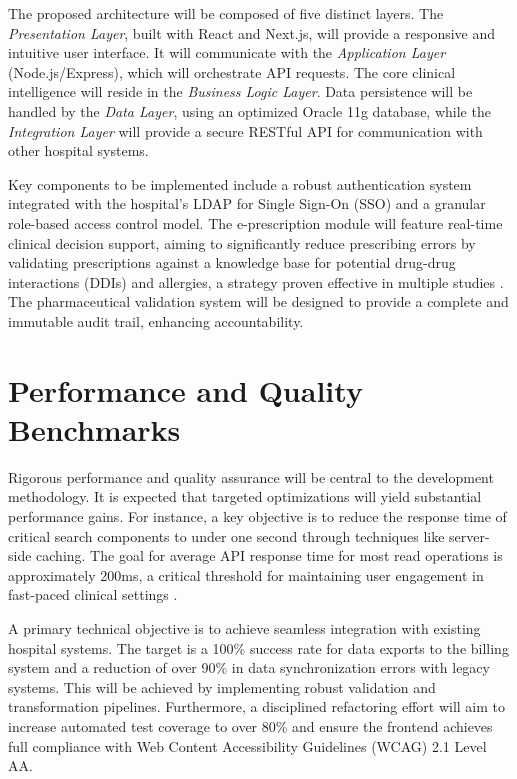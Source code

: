The proposed architecture will be composed of five distinct layers. The \textit{Presentation Layer}, built with React and Next.js, will provide a responsive and intuitive user interface. It will communicate with the \textit{Application Layer} (Node.js/Express), which will orchestrate API requests. The core clinical intelligence will reside in the \textit{Business Logic Layer}. Data persistence will be handled by the \textit{Data Layer}, using an optimized Oracle 11g database, while the \textit{Integration Layer} will provide a secure RESTful API for communication with other hospital systems.

Key components to be implemented include a robust authentication system integrated with the hospital's LDAP for Single Sign-On (SSO) and a granular role-based access control model. The e-prescription module will feature real-time clinical decision support, aiming to significantly reduce prescribing errors by validating prescriptions against a knowledge base for potential drug-drug interactions (DDIs) and allergies, a strategy proven effective in multiple studies \cite{bates2014}. The pharmaceutical validation system will be designed to provide a complete and immutable audit trail, enhancing accountability.

\section{Performance and Quality Benchmarks}

Rigorous performance and quality assurance will be central to the development methodology. It is expected that targeted optimizations will yield substantial performance gains. For instance, a key objective is to reduce the response time of critical search components to under one second through techniques like server-side caching. The goal for average API response time for most read operations is approximately 200ms, a critical threshold for maintaining user engagement in fast-paced clinical settings \cite{nielsen2012}.

A primary technical objective is to achieve seamless integration with existing hospital systems. The target is a 100\% success rate for data exports to the billing system and a reduction of over 90\% in data synchronization errors with legacy systems. This will be achieved by implementing robust validation and transformation pipelines. Furthermore, a disciplined refactoring effort will aim to increase automated test coverage to over 80\% and ensure the frontend achieves full compliance with Web Content Accessibility Guidelines (WCAG) 2.1 Level AA.

